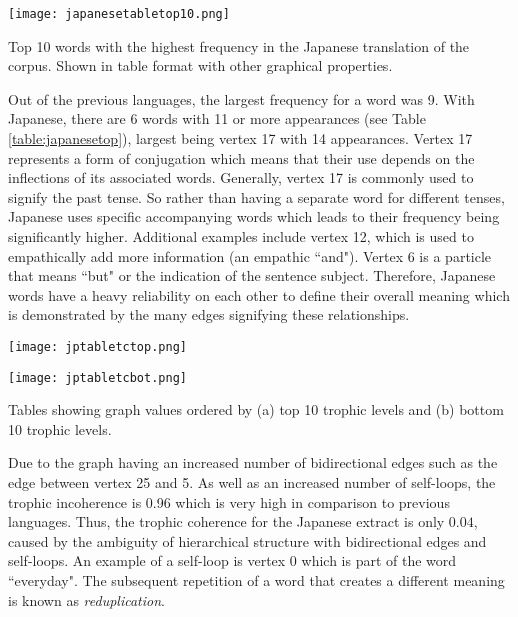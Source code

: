 \begin{table}[!htb]
\centering
\texttt{[image: japanesetabletop10.png]}
\caption{Top 10 words with the highest frequency in the Japanese translation of the corpus. Shown in table format with other graphical properties. }
\label{table:japanesetop}
\end{table}

Out of the previous languages, the largest frequency for a word was 9. With Japanese, there are 6 words with 11 or more appearances (see Table \ref{table:japanesetop}), largest being vertex 17 with 14 appearances. Vertex 17 represents a form of conjugation which means that their use depends on the inflections of its associated words. Generally, vertex 17 is commonly used to signify the past tense. So rather than having a separate word for different tenses, Japanese uses specific accompanying words which leads to their frequency being significantly higher. Additional examples include vertex 12, which is used to empathically add more information (an empathic ``and"). Vertex 6 is a particle that means ``but" or the indication of the sentence subject. Therefore, Japanese words have a heavy reliability on each other to define their overall meaning which is demonstrated by the many edges signifying these relationships.

\begin{table}[!htb]
\centering
\begin{subtable}{.45\textwidth}
	\centering
	\texttt{[image: jptabletctop.png]}
	\caption{}
	\label{table:japanesetoptc}
\end{subtable}
\hfill
\begin{subtable}{.45\textwidth}
	\centering
	\texttt{[image: jptabletcbot.png]}
	\caption{}
	\label{table:japanesebottc}
\end{subtable}
\caption{Tables showing graph values ordered by (a) top 10 trophic levels and (b) bottom 10 trophic levels.}
\end{table}

Due to the graph having an increased number of bidirectional edges such as the edge between vertex 25 and 5. As well as an increased number of self-loops, the trophic incoherence is 0.96 which is very high in comparison to previous languages. Thus, the trophic coherence for the Japanese extract is only $0.04$, caused by the ambiguity of hierarchical structure with bidirectional edges and self-loops. An example of a self-loop is vertex 0 which is part of the word ``everyday". The subsequent repetition of a word that creates a different meaning is known as \emph{reduplication}.


